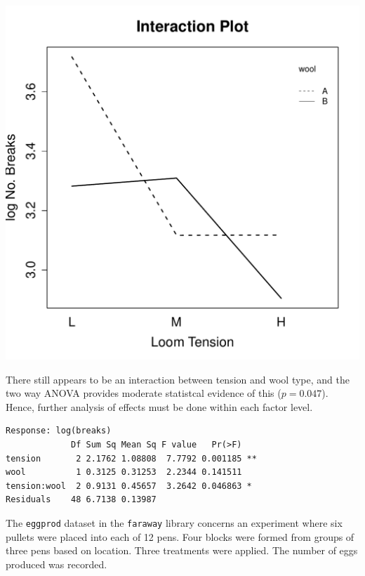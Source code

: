\documentclass{homework}
\begin{document}
\begin{solution}
\begin{minipage}{.5\textwidth}
\includegraphics[width=\textwidth]{wool_interaction3.pdf}
\end{minipage}
\begin{minipage}{.5\textwidth}
  There still appears to be an interaction between tension and wool
  type, and the two way ANOVA provides moderate statistcal evidence
  of this ($p=0.047$).  Hence, further analysis of effects must be done within each factor level.
{\small
\begin{verbatim}
Response: log(breaks)
             Df Sum Sq Mean Sq F value   Pr(>F)   
tension       2 2.1762 1.08808  7.7792 0.001185 **
wool          1 0.3125 0.31253  2.2344 0.141511   
tension:wool  2 0.9131 0.45657  3.2642 0.046863 * 
Residuals    48 6.7138 0.13987                    
\end{verbatim}
}
\end{minipage}
\end{solution}

\begin{longproblem}
  The \texttt{eggprod} dataset in the \texttt{faraway} library concerns an experiment where six pullets were placed into each of 12 pens.  Four blocks were formed from groups of three pens based on location.  Three treatments were applied.  The number of eggs produced was recorded.


\end{longproblem}
\end{document}
